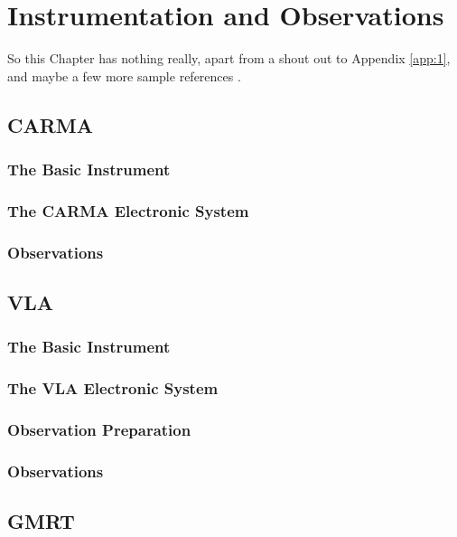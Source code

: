

\chapter{Instrumentation and Observations} 
\label{chap:3}

So this Chapter has nothing really, apart from a shout out to Appendix \ref{app:1}, and maybe a few more sample references \citep{harper_2006, seaquist_taylor_1990}.

\section{CARMA}\label{sec:1}
\subsection{The Basic Instrument}\label{subsec:1}
\subsection{The CARMA Electronic System}\label{subsec:2}
\subsection{Observations}\label{subsec:3}
\section{VLA}\label{sec:2}
\subsection{The Basic Instrument}\label{subsec:4}
\subsection{The VLA Electronic System}\label{subsec:5}
\subsection{Observation Preparation}\label{subsec:6}
\subsection{Observations}\label{subsec:7}
\section{GMRT}\label{sec:3}

